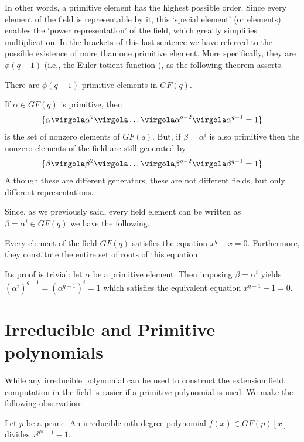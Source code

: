 In other words, a primitive element has the highest possible order. Since every element of the field is representable by it, this `special element' (or elements) enables the `power representation' of the field, which greatly simplifies multiplication.
In the brackets of this last sentence we have referred to the possible existence of more than one primitive element. More specifically, they are \( \phi(q-1) \) (i.e., the Euler totient function \cite{b:moon}), as the following theorem asserts.


\begin{Theorem}
There are $\phi(q-1)$ primitive elements in $GF(q)$.
\end{Theorem}

If \(\alpha \in GF(q)\) is primitive, then
\[
\{\alpha \virgola \alpha^2 \virgola \ldots \virgola \alpha^{q-2} \virgola \alpha^{q-1}=1 \}
\]
is the set of nonzero elements of \(GF(q)\). But, if \(\beta=\alpha^i\) is also primitive then the nonzero elements of the field are still generated by
\[
\{\beta \virgola \beta^2 \virgola \ldots \virgola \beta^{q-2} \virgola \beta^{q-1}=1 \}
\]
Although these are different generators, these are not different fields, but only different representations.

Since, as we previously said, every field element can be written as \(\beta=\alpha^i \in GF(q) \) we have the following.

\begin{Theorem}
Every element of the field $GF(q)$ satisfies the equation \(x^q-x=0\). Furthermore, they constitute the entire set of roots of this equation. \label{th:roots}
\end{Theorem}
Its proof is trivial: let $\alpha$ be a primitive element. Then imposing \(\beta = \alpha^i \) yields \( {(\alpha^i)}^{q-1} = {(\alpha^{q-1})}^{i} =1 \) which satisfies the equivalent equation \(x^{q-1}-1=0\).
\label{th:FieldGFBuild}


\section{Irreducible and Primitive polynomials} \label{sec:primpoly}

While any irreducible polynomial can be used to construct the extension field, computation in the field is easier if a primitive polynomial is used. We make the following observation:

\begin{Theorem}
Let $p$ be a prime. An irreducible mth-degree polynomial $f(x) \in GF(p)[x] $ divides \( x^{p^m-1}-1\).
\end{Theorem}

